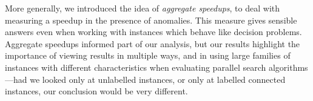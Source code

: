 \documentclass{llncs}
\begin{document}
More generally, we introduced the idea of \emph{aggregate speedups}, to deal with measuring a
speedup in the presence of anomalies. This measure gives sensible answers even when working with
instances which behave like decision problems. Aggregate speedups informed part of our analysis, but
our results highlight the importance of viewing results in multiple ways, and in using large
families of instances with different characteristics when evaluating parallel search
algorithms---had we looked only at unlabelled instances, or only at labelled connected instances,
our conclusion would be very different.



\end{document}

